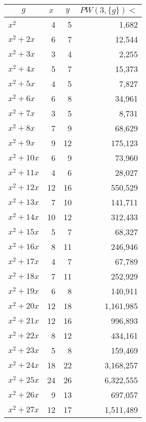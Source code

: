 \documentclass[a4paper]{amsproc}
\theoremstyle{plain}
\begin{document}
\begin{longtable}{ | l | r | r | r | }
\caption{}\\
\hline

\multicolumn{1}{|c|}{$g$} &
\multicolumn{1}{|c|}{$x$} &
\multicolumn{1}{|c|}{$y$} &
\multicolumn{1}{|c|}{$PW(3, \{g\}) <$} \\ \hline
\endhead


$x^2$ & 4 & 5 & 1{,}682 \\ \hline
$x^2 + 2x$ & 6 & 7 & 12{,}544 \\ \hline
$x^2 + 3x$ & 3 & 4 & 2{,}255 \\ \hline
$x^2 + 4x$ & 5 & 7 & 15{,}373 \\ \hline
$x^2 + 5x$ & 4 & 5 & 7{,}827 \\ \hline
$x^2 + 6x$ & 6 & 8 & 34{,}961 \\ \hline
$x^2 + 7x$ & 3 & 5 & 8{,}731 \\ \hline
$x^2 + 8x$ & 7 & 9 & 68{,}629 \\ \hline
$x^2 + 9x$ & 9 & 12 & 175{,}123 \\ \hline
$x^2 + 10x$ & 6 & 9 & 73{,}960 \\ \hline
$x^2 + 11x$ & 4 & 6 & 28{,}027 \\ \hline
$x^2 + 12x$ & 12 & 16 & 550{,}529 \\ \hline
$x^2 + 13x$ & 7 & 10 & 141{,}711 \\ \hline
$x^2 + 14x$ & 10 & 12 & 312{,}433 \\ \hline
$x^2 + 15x$ & 5 & 7 & 68{,}327 \\ \hline
$x^2 + 16x$ & 8 & 11 & 246{,}946 \\ \hline
$x^2 + 17x$ & 4 & 7 & 67{,}789 \\ \hline
$x^2 + 18x$ & 7 & 11 & 252{,}929 \\ \hline
$x^2 + 19x$ & 6 & 8 & 140{,}911 \\ \hline
$x^2 + 20x$ & 12 & 18 & 1{,}161{,}985 \\ \hline
$x^2 + 21x$ & 12 & 16 & 996{,}893 \\ \hline
$x^2 + 22x$ & 8 & 12 & 434{,}161 \\ \hline
$x^2 + 23x$ & 5 & 8 & 159{,}469 \\ \hline
$x^2 + 24x$ & 18 & 22 & 3{,}168{,}257 \\ \hline
$x^2 + 25x$ & 24 & 26 & 6{,}322{,}555 \\ \hline
$x^2 + 26x$ & 9 & 13 & 697{,}057 \\ \hline
$x^2 + 27x$ & 12 & 17 & 1{,}511{,}489 \\ \hline

\end{longtable}
\end{document}
